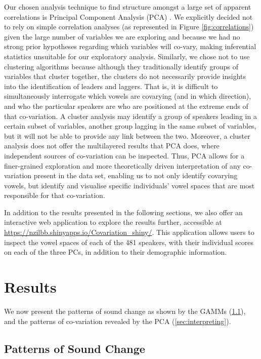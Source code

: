 \documentclass[review]{elsarticle} %
\begin{document}
Our chosen analysis technique to find structure amongst a large set of apparent correlations is Principal Component Analysis (PCA) \citep{venables2013modern, PCAIntro}. We explicitly decided not to rely on simple correlation analyses (as represented in Figure \ref{fig:correlations}) given the large number of variables we are exploring and because we had no strong prior hypotheses regarding which variables will co-vary, making inferential statistics unsuitable for our exploratory analysis. Similarly, we chose not to use clustering algorithms because although they traditionally identify groups of variables that cluster together, the clusters do not necessarily provide insights into the identification of leaders and laggers.   That is, it is difficult to simultaneously interrogate which vowels are covarying (and in which direction), and who the particular speakers are who are positioned at the extreme ends of that co-variation. A cluster analysis may identify a group of speakers leading in a certain subset of variables, another group lagging in the same subset of variables, but it will not be able to provide any link between the two. 
Moreover, a cluster analysis does not offer the multilayered results that PCA does, where independent sources of co-variation can be inspected. Thus, PCA allows for a finer-grained exploration and more theoretically driven interpretation of any co-variation present in the data set, enabling us to not only identify covarying vowels, but identify and visualise specific individuals' vowel spaces that are most responsible for that co-variation.

In addition to the results presented in the following sections, we also offer an interactive web application to explore the results further, accessible at \url{https://nzilbb.shinyapps.io/Covariation_shiny/}. This application allows users to inspect the vowel spaces of each of the 481 speakers, with their individual scores on each of the three PCs, in addition to their demographic information.

\section{Results}

We now present the patterns of sound change as shown by the GAMMs (\ref{sec:soundchange}), and the patterns of co-variation revealed by the PCA (\ref{sec:interpreting}).

\subsection{Patterns of Sound Change}
\label{sec:soundchange}
\end{document}
